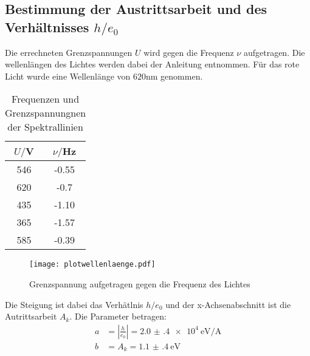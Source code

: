 \subsection{Bestimmung der Austrittsarbeit und des Verhältnisses $h/e_0$}

Die errechneten Grenzspannungen $U$ wird gegen die Frequenz $\nu$ aufgetragen. Die wellenlängen des Lichtes werden dabei der
Anleitung entnommen. Für das rote Licht wurde eine Wellenlänge von $620$nm genommen.


\begin{table}[H]
  \centering
  \caption{Frequenzen und Grenzspannungnen der Spektrallinien}
  \label{tab:Spannungsamplitude}
  \begin{tabular}{c c}
    \toprule
    $U/$V & $\nu/$Hz \\
    \midrule
    546 &     -0.55 \\
    620 &     -0.7 \\
    435 &     -1.10 \\
    365 &     -1.57 \\
    585 &     -0.39 \\
    \bottomrule
  \end{tabular}
\end{table}



\begin{figure}[H]
  \centering
  \texttt{[image: plotwellenlaenge.pdf]}
  \caption{Grenzspannung aufgetragen gegen die Frequenz des Lichtes}
  \label{fig:plotorange}
\end{figure}



Die Steigung ist dabei das Verhätlnis $h/e_0$ und der x-Achsenabschnitt ist die Autrittsarbeit $A_k$.
Die Parameter betragen:
\begin{align*}
  a &=| \frac{h}{e_0} |= \SI{2.0(4)e4}{\eV\per\ampere} \\
  b &= A_k = \SI{1.1(4)}{\eV}
\end{align*}
